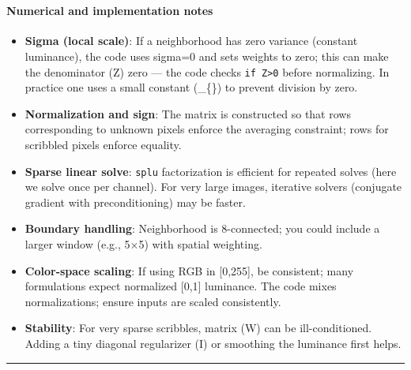 \documentclass[11pt]{article}
\providecommand{\tightlist}{%
      \setlength{\itemsep}{0pt}\setlength{\parskip}{0pt}}
\begin{document}
    \begin{center}
    \end{center}
    { \hspace*{\fill} \\}
    
    \hypertarget{numerical-and-implementation-notes}{%
\paragraph{\texorpdfstring{\textbf{Numerical and implementation
notes}}{Numerical and implementation notes}}\label{numerical-and-implementation-notes}}

\begin{itemize}
\tightlist
\item
  \textbf{Sigma (local scale)}: If a neighborhood has zero variance
  (constant luminance), the code uses sigma=0 and sets weights to zero;
  this can make the denominator (Z) zero --- the code checks
  \texttt{if\ Z\textgreater{}0} before normalizing. In practice one uses
  a small constant (\sigma\_\{\min\}) to prevent division by zero.
\item
  \textbf{Normalization and sign}: The matrix is constructed so that
  rows corresponding to unknown pixels enforce the averaging constraint;
  rows for scribbled pixels enforce equality.
\item
  \textbf{Sparse linear solve}: \texttt{splu} factorization is efficient
  for repeated solves (here we solve once per channel). For very large
  images, iterative solvers (conjugate gradient with preconditioning)
  may be faster.
\item
  \textbf{Boundary handling}: Neighborhood is 8-connected; you could
  include a larger window (e.g., 5×5) with spatial weighting.
\item
  \textbf{Color-space scaling}: If using RGB in {[}0,255{]}, be
  consistent; many formulations expect normalized {[}0,1{]} luminance.
  The code mixes normalizations; ensure inputs are scaled consistently.
\item
  \textbf{Stability}: For very sparse scribbles, matrix (W) can be
  ill-conditioned. Adding a tiny diagonal regularizer (\varepsilon I) or
  smoothing the luminance first helps.
\end{itemize}

\begin{center}\rule{0.5\linewidth}{0.5pt}\end{center}
\end{document}
